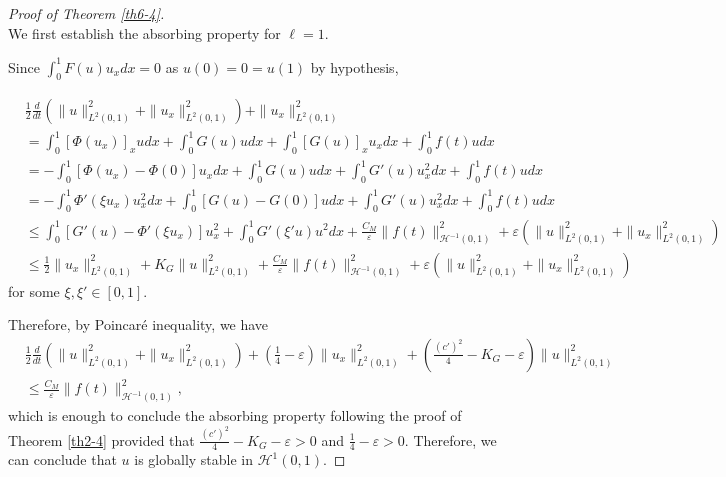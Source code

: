 \documentclass[10pt,a4paper,final]{article}
\numberwithin{equation}{section}
\newcommand{\cH}{\mathcal{H}}
\newcommand{\Ge}{\varepsilon}
\begin{document}
\begin{proof}[Proof of Theorem \ref{th6-4}]\ \\
We first establish the absorbing property for $\ell=1$. 

Since $\int_0^1F(u)u_xdx=0$ as $u(0)=0=u(1)$ by hypothesis,

\begin{align*}
    &\frac{1}{2}\frac{d}{dt}(\|u\|_{L^2(0,1)}^2+\|u_x\|_{L^2(0,1)}^2)+\|u_x\|_{L^2(0,1)}^2\\
    &= \int_0^1[\Phi(u_x)]_xudx+\int_0^1G(u)udx+\int_0^1[G(u)]_xu_xdx+\int_0^1f(t)udx\\
    &= -\int_0^1 [\Phi(u_x)-\Phi(0)]u_xdx+\int_0^1G(u)udx+\int_0^1G'(u)u_x^2dx+\int_0^1f(t)udx\\
    &= -\int_0^1 \Phi'(\xi u_x )u_x^2dx+\int_0^1[G(u)-G(0)]udx+\int_0^1G'(u)u_x^2dx+\int_0^1f(t)udx\\
    &\leq \int_0^1[G'(u)-\Phi'(\xi u_x)]u_x^2+\int_0^1 G'(\xi' u)u^2dx+\frac{C_M}{\Ge}\|f(t)\|^2_{\cH^{-1}(0,1)}+\Ge(\|u\|_{L^2(0,1)}^2+\|u_x\|_{L^2(0,1)}^2)\\
    &\leq \frac{1}{2}\|u_x\|_{L^2(0,1)}^2+K_G\|u\|_{L^2(0,1)}^2+\frac{C_M}{\Ge}\|f(t)\|^2_{\cH^{-1}(0,1)}+\Ge(\|u\|_{L^2(0,1)}^2+\|u_x\|_{L^2(0,1)}^2)
\end{align*}
for some $\xi,\xi'\in[0,1]$.

Therefore, by Poincar\'e inequality, we have 
\begin{align*}
     &\frac{1}{2}\frac{d}{dt}(\|u\|_{L^2(0,1)}^2+\|u_x\|_{L^2(0,1)}^2)+(\frac{1}{4}-\Ge)\|u_x\|_{L^2(0,1)}^2+(\frac
     {(c')^2}{4}-K_G-\Ge)\|u\|_{L^2(0,1)}^2\\
     &\leq \frac{C_M}{\Ge}\|f(t)\|^2_{\cH^{-1}(0,1)},
\end{align*}
which is enough to conclude the absorbing property following the proof of Theorem \ref{th2-4} provided that $\frac{(c')^2}{4}-K_G-\Ge>0$ and $\frac14-\Ge>0$. Therefore, we can conclude that $u$ is globally stable in $\cH^1(0,1)$.




\end{proof}
\end{document}
